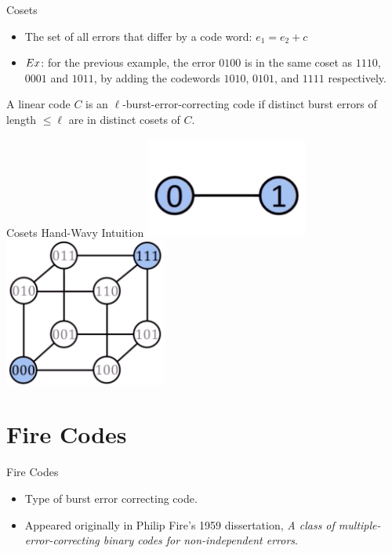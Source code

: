\documentclass[aspectratio=169]{beamer}
\begin{document}
\begin{frame}{Cosets}
    \begin{itemize}
        \item The set of all errors that differ by a code word: $e_1 = e_2 + c$
        \pause
        \item $\emph{Ex}$: for the previous example, the error $0100$ is in the same coset as $1110$, $0001$ and $1011$, by adding the codewords $1010$, $0101$, and $1111$ respectively.
    \end{itemize}
    \pause
    \begin{lem}
        A linear code $C$ is an $\ell$-burst-error-correcting code if distinct burst errors of length $\le \ell$ are in distinct cosets of $C$.
    \end{lem}
\end{frame}

\begin{frame}{Cosets Hand-Wavy Intuition}
    \includegraphics[width=0.4\textwidth]{01.png}
    \includegraphics[width=0.4\textwidth]{000-111.png}
\end{frame}


\section{Fire Codes}
\frame{\sectionpage}


\begin{frame}{Fire Codes}
    \begin{itemize}
        \item Type of burst error correcting code.
        \pause
        \item Appeared originally in Philip Fire's 1959 dissertation, \textit{A class of multiple-error-correcting binary codes for non-independent errors}.
    \end{itemize}
\end{frame}
\end{document}
